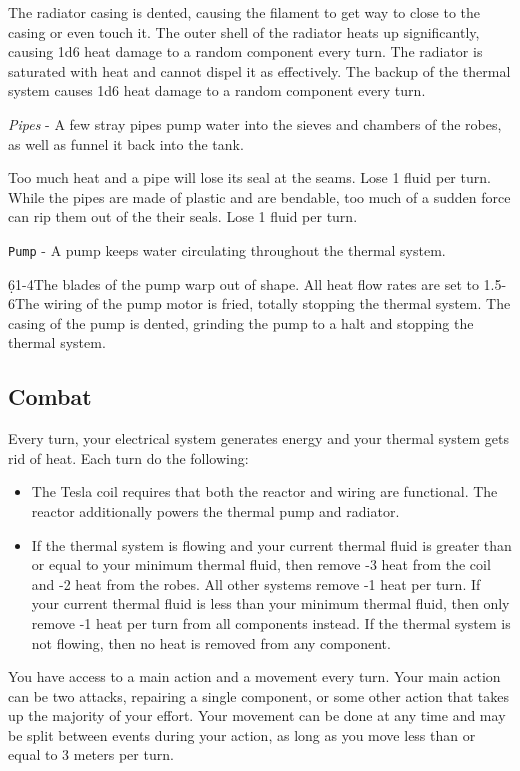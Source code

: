 \documentclass[a4paper]{article}
\begin{document}
\ph
{The radiator casing is dented, causing the filament to get way to close to the casing or even touch it. The outer shell of the radiator heats up significantly, causing 1d6 heat damage to a random component every turn.}
{The radiator is saturated with heat and cannot dispel it as effectively. The backup of the thermal system causes 1d6 heat damage to a random component every turn.}

\textit{Pipes} - A few stray pipes pump water into the sieves and chambers of the robes, as well as funnel it back into the tank.

\ph
{Too much heat and a pipe will lose its seal at the seams. Lose 1 fluid per turn.}
{While the pipes are made of plastic and are bendable, too much of a sudden force can rip them out of the their seals. Lose 1 fluid per turn.}

\texttt{Pump} - A pump keeps water circulating throughout the thermal system. 

\ph
{\d6{1-4}{The blades of the pump warp out of shape. All heat flow rates are set to 1.}{5-6}{The wiring of the pump motor is fried, totally stopping the thermal system.}{}{}{}{}}
{The casing of the pump is dented, grinding the pump to a halt and stopping the thermal system.}

\subsection{Combat} \label{arcmage_combat}

Every turn, your electrical system generates energy and your thermal system gets rid of heat. Each turn do the following:

\begin{itemize}
\item The Tesla coil requires that both the reactor and wiring are functional. The reactor additionally powers the thermal pump and radiator.
\item If the thermal system is flowing and your current thermal fluid is greater than or equal to your minimum thermal fluid, then remove -3 heat from the coil and -2 heat from the robes. All other systems remove -1 heat per turn. If your current thermal fluid is less than your minimum thermal fluid, then only remove -1 heat per turn from all components instead. If the thermal system is not flowing, then no heat is removed from any component.
\end{itemize}

You have access to a main action and a movement every turn. Your main action can be two attacks, repairing a single component, or some other action that takes up the majority of your effort. Your movement can be done at any time and may be split between events during your action, as long as you move less than or equal to 3 meters per turn.
\end{document}
